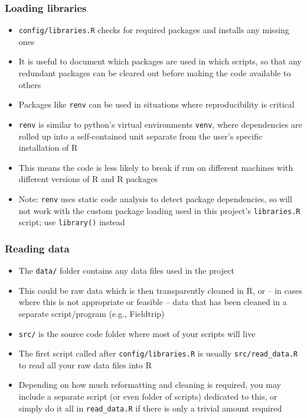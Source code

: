\documentclass[
]{article}
\begin{document}
\hypertarget{loading-libraries}{%
\subsubsection{Loading libraries}\label{loading-libraries}}

\begin{itemize}
\item
  \texttt{config/libraries.R} checks for required packages and installs
  any missing ones
\item
  It is useful to document which packages are used in which scripts, so
  that any redundant packages can be cleared out before making the code
  available to others
\item
  Packages like \texttt{renv} can be used in situations where
  reproducibility is critical
\item
  \texttt{renv} is similar to python's virtual environments
  \texttt{venv}, where dependencies are rolled up into a self-contained
  unit separate from the user's specific installation of R
\item
  This means the code is less likely to break if run on different
  machines with different versions of R and R packages
\item
  Note: \texttt{renv} uses static code analysis to detect package
  dependencies, so will not work with the custom package loading used in
  this project's \texttt{libraries.R} script; use \texttt{library()}
  instead
\end{itemize}

\hypertarget{reading-data}{%
\subsubsection{Reading data}\label{reading-data}}

\begin{itemize}
\item
  The \texttt{data/} folder contains any data files used in the project
\item
  This could be raw data which is then transparently cleaned in R, or --
  in cases where this is not appropriate or feasible -- data that has
  been cleaned in a separate script/program (e.g., Fieldtrip)
\item
  \texttt{src/} is the source code folder where most of your scripts
  will live
\item
  The first script called after \texttt{config/libraries.R} is usually
  \texttt{src/read\_data.R} to read all your raw data files into R
\item
  Depending on how much reformatting and cleaning is required, you may
  include a separate script (or even folder of scripts) dedicated to
  this, or simply do it all in \texttt{read\_data.R} if there is only a
  trivial amount required
\end{itemize}
\end{document}
